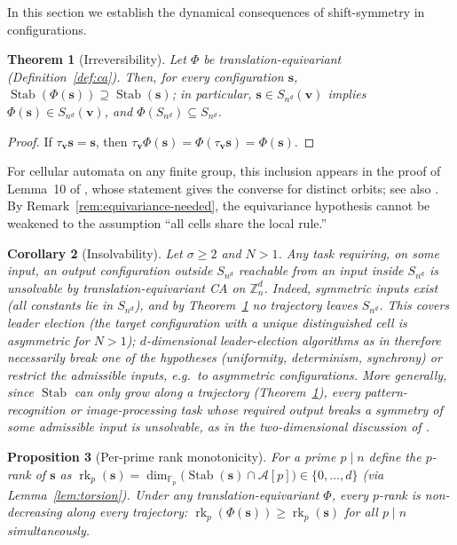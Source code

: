 \documentclass[11pt,a4paper]{article}
\newtheorem{theorem}{Theorem}[section]
\newtheorem{corollary}[theorem]{Corollary}
\newtheorem{proposition}[theorem]{Proposition}
\theoremstyle{remark}
\DeclareMathOperator{\Stab}{Stab}
\DeclareMathOperator{\rk}{rk}
\newcommand{\ZZ}{\mathbb{Z}}
\newcommand{\FF}{\mathbb{F}}
\newcommand{\A}{\mathcal{A}}
\newcommand{\vv}{\mathbf{v}}
\newcommand{\ssb}{\mathbf{s}}
\begin{document}
In this section we establish the dynamical consequences of shift-symmetry in configurations.

\begin{theorem}[Irreversibility]\label{thm:irrev}
Let $\Phi$ be translation-equivariant (Definition~\ref{def:ca}). Then, for every configuration $\ssb$,
$\Stab(\Phi(\ssb))\supseteq\Stab(\ssb)$;
in particular, $\ssb\in S_{n^d}(\vv)$ implies
$\Phi(\ssb)\in S_{n^d}(\vv)$, and $\Phi(S_{n^d})\subseteq S_{n^d}$.
\end{theorem}

\begin{proof}
If $\tau_\vv\ssb=\ssb$, then
$\tau_\vv\Phi(\ssb)=\Phi(\tau_\vv\ssb)=\Phi(\ssb)$.
\end{proof}

For cellular automata on any finite group, this inclusion appears in the
proof of Lemma~10 of \cite{cg2017}, whose statement gives the converse
for distinct orbits; see also \cite[Thm.~2(iii)]{cgvn2017}. By Remark~\ref{rem:equivariance-needed},
the equivariance hypothesis cannot be weakened to the assumption ``all cells
share the local rule.''

\begin{corollary}[Insolvability]\label{cor:insolv}
Let $\sigma\ge2$ and $N>1$. Any task requiring, on some input, an output
configuration outside $S_{n^d}$ reachable from an input inside $S_{n^d}$
is unsolvable by translation-equivariant CA on $\ZZ_n^d$. Indeed, symmetric inputs
exist (all constants lie in $S_{n^d}$), and by Theorem~\ref{thm:irrev} no
trajectory leaves $S_{n^d}$. This covers leader election
(the target configuration with a unique distinguished cell is asymmetric
for $N>1$); $d$-dimensional
leader-election algorithms as in \cite{nichitiu1999,stratmann2002}
therefore necessarily
break one of the hypotheses (uniformity, determinism, synchrony) or
restrict the admissible inputs, e.g.\ to asymmetric configurations.
More generally, since $\Stab$ can only grow along a trajectory
(Theorem~\ref{thm:irrev}), every pattern-recognition or image-processing
task whose required output breaks a symmetry of some admissible input is
unsolvable, as in the two-dimensional discussion of \cite{banda2019}.
\end{corollary}

\begin{proposition}[Per-prime rank monotonicity]\label{prop:rank}
For a prime $p\mid n$ define the \emph{$p$-rank} of $\ssb$ as
$\rk_p(\ssb)=\dim_{\FF_p}\bigl(\Stab(\ssb)\cap\A[p]\bigr)\in\{0,\dots,d\}$
(via Lemma~\ref{lem:torsion}). Under any translation-equivariant $\Phi$,
every $p$-rank is non-decreasing along every trajectory:
$\rk_p(\Phi(\ssb))\ge\rk_p(\ssb)$ for all $p\mid n$ simultaneously.
\end{proposition}
\end{document}
